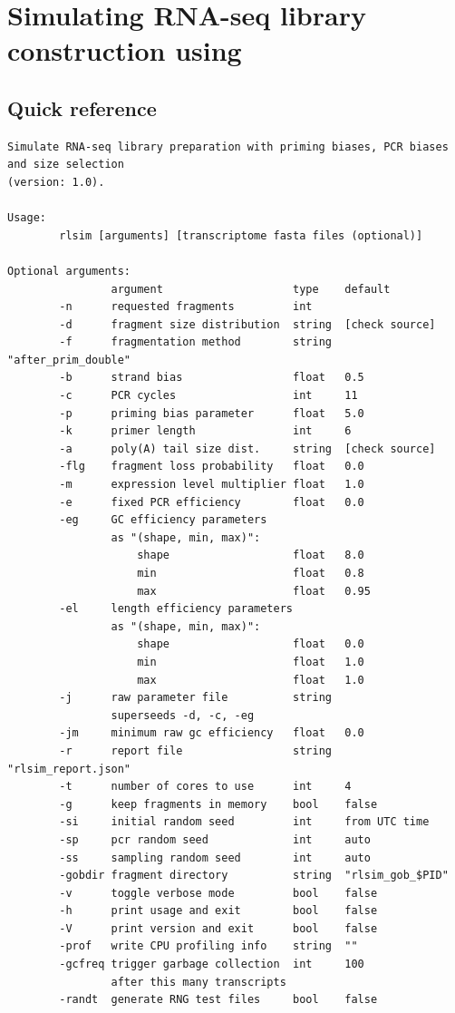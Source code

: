 \section{Simulating RNA-seq library construction using \rlsim}

\subsection{Quick reference}
\label{ss:qrlsim}

\begin{verbatim}
Simulate RNA-seq library preparation with priming biases, PCR biases and size selection 
(version: 1.0).

Usage:
        rlsim [arguments] [transcriptome fasta files (optional)]

Optional arguments:
                argument                    type    default  
        -n      requested fragments         int     
        -d      fragment size distribution  string  [check source]
        -f      fragmentation method        string  "after_prim_double"
        -b      strand bias                 float   0.5
        -c      PCR cycles                  int     11
        -p      priming bias parameter      float   5.0
        -k      primer length               int     6
        -a      poly(A) tail size dist.     string  [check source]
        -flg    fragment loss probability   float   0.0
        -m      expression level multiplier float   1.0
        -e      fixed PCR efficiency        float   0.0
        -eg     GC efficiency parameters 
                as "(shape, min, max)":
                    shape                   float   8.0
                    min                     float   0.8
                    max                     float   0.95
        -el     length efficiency parameters 
                as "(shape, min, max)":
                    shape                   float   0.0
                    min                     float   1.0
                    max                     float   1.0
        -j      raw parameter file          string  
                superseeds -d, -c, -eg
        -jm     minimum raw gc efficiency   float   0.0
        -r      report file                 string  "rlsim_report.json"
        -t      number of cores to use      int     4
        -g      keep fragments in memory    bool    false
        -si     initial random seed         int     from UTC time
        -sp     pcr random seed             int     auto
        -ss     sampling random seed        int     auto
        -gobdir fragment directory          string  "rlsim_gob_$PID"
        -v      toggle verbose mode         bool    false
        -h      print usage and exit        bool    false
        -V      print version and exit      bool    false
        -prof   write CPU profiling info    string  ""
        -gcfreq trigger garbage collection  int     100
                after this many transcripts
        -randt  generate RNG test files     bool    false


\end{verbatim}
